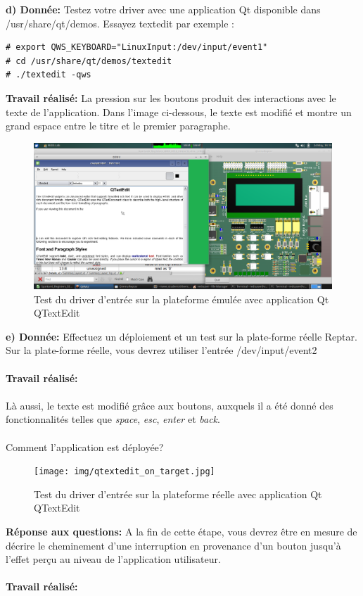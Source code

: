 \textbf{d) Donnée: }Testez votre driver avec une application Qt disponible dans /usr/share/qt/demos. Essayez textedit
par exemple : 
\begin{lstlisting}
# export QWS_KEYBOARD="LinuxInput:/dev/input/event1"
# cd /usr/share/qt/demos/textedit
# ./textedit -qws 
\end{lstlisting}
\textbf{Travail réalisé: }
La pression sur les boutons produit des interactions avec le texte de l'application. Dans l'image ci-dessous, le texte est modifié et montre un grand espace entre le titre et le premier paragraphe.
\begin{figure}[H]
	\begin{center}
		\includegraphics[width=17cm]{img/qtextedit_test_emulator.png}
		\caption{Test du driver d'entrée sur la plateforme émulée avec application Qt QTextEdit}
		\label{qtextedit_device_input_emul}
	\end{center}
\end{figure}

\textbf{e) Donnée: }Effectuez un déploiement et un test sur la plate-forme réelle Reptar. Sur la plate-forme réelle, vous
devrez utiliser l'entrée /dev/input/event2\\\\
\textbf{Travail réalisé: }\\\\
Là aussi, le texte est modifié grâce aux boutons, auxquels il a été donné des fonctionnalités telles que \textit{space}, \textit{esc}, \textit{enter} et \textit{back}.
\color{red}\\\\ Comment l'application est déployée? \color{black}
\begin{figure}[H]
	\begin{center}
		\texttt{[image: img/qtextedit\_on\_target.jpg]}
		\caption{Test du driver d'entrée sur la plateforme réelle avec application Qt QTextEdit}
		\label{qtextedit_device_input_reptar}
	\end{center}
\end{figure}
\color{red}
\textbf{Réponse aux questions: }A la fin de cette étape, vous devrez être en mesure de décrire le cheminement d'une interruption
en provenance d'un bouton jusqu'à l'effet perçu au niveau de l’application utilisateur. \\\\
\textbf{Travail réalisé: }\\\\\color{black}